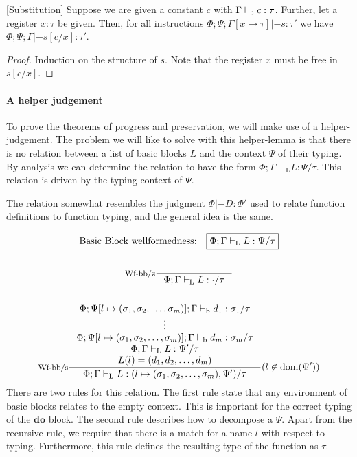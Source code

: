 \documentclass[a4paper, oneside, 10pt, final]{memoir}
\begin{document}
\begin{lem}{[Substitution]}
  \label{lem:substitution}
  Suppose we are given a constant $c$ with $\Gamma |-_{\mathrm{c}} c :
  \tau$. Further, let a register $x : \tau$ be given. Then, for all
  instructions $\Phi;\Psi;\Gamma[x \mapsto \tau] |- s : \tau'$ we have
  $\Phi;\Psi;\Gamma |- s[c/x] : \tau'$.
\end{lem}
\begin{proof}
  Induction on the structure of $s$. Note that the register $x$ must
  be free in $s[c/x]$.
\end{proof}

\paragraph{A helper judgement}

\newcommand{\tpbb}{|-_{\mathrm{L}}}
To prove the theorems of progress and preservation, we will make use
of a helper-judgement. The problem we will like to solve with this
helper-lemma is that there is no relation between a list of basic
blocks $L$ and the context $\Psi$ of their typing. By analysis we can
determine the relation to have the form $\boxed{\Phi;\Gamma \tpbb L :
  \Psi / \tau}$. This relation is driven by the typing context of $\Psi$.

The relation somewhat resembles the judgment $\Phi |- D : \Phi'$ used
to relate function definitions to function typing, and the general
idea is the same.

\begin{gather*}
  \text{Basic Block wellformedness:} \quad \boxed{\Phi;\Gamma \tpbb
    L : \Psi / \tau}\\\\
  \inference[Wf-bb/z]{}{\Phi;\Gamma \tpbb L : \cdot / \tau}\\\\
  \inference[Wf-bb/s]{\Phi;\Psi[l\mapsto \sbundle];\Gamma \tpb d_1 :  \sigma_1 / \tau\\
  \vdots\\
  \Phi;\Psi[l\mapsto \sbundle];\Gamma \tpb d_m : \sigma_m / \tau\\
  \Phi;\Gamma \tpbb L : \Psi' / \tau\\
  L(l) = \dbundle}
  {\Phi;\Gamma \tpbb L : (l \mapsto \sbundle, \Psi') / \tau}(l \not \in \dom{\Psi'})
\end{gather*}
There are two rules for this relation. The first rule state that any
environment of basic blocks relates to the empty context. This is
important for the correct typing of the $\mathbf{do}$ block. The
second rule describes how to decompose a $\Psi$. Apart from the
recursive rule, we require that there is a match for a name $l$ with
respect to typing. Furthermore, this rule defines the resulting type
of the function as $\tau$.
\end{document}
